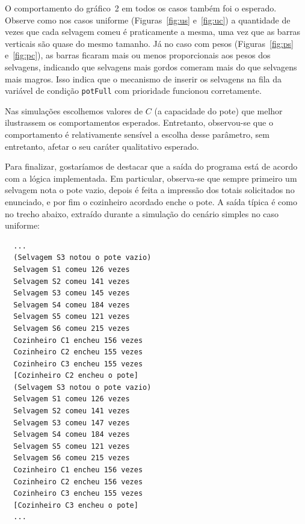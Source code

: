 \documentclass[11pt,a4paper]{article}
\begin{document}
O comportamento do gráfico~2 em todos os casos também foi o esperado. Observe como nos casos 
uniforme (Figuras~\ref{fig:us} e~\ref{fig:uc}) a quantidade de vezes que cada selvagem comeu é 
praticamente a mesma, uma vez que as barras verticais são quase do mesmo tamanho. Já no caso com 
pesos (Figuras~\ref{fig:ps} e~\ref{fig:pc}), as barras ficaram mais ou menos proporcionais aos pesos 
dos selvagens, indicando que selvagens mais gordos comeram mais do que selvagens mais magros. Isso 
indica que o mecanismo de inserir os selvagens na fila da variável de condição \verb|potFull| com 
prioridade funcionou corretamente.

Nas simulações escolhemos valores de $C$ (a capacidade do pote) que melhor ilustrassem os 
comportamentos esperados. Entretanto, observou-se que o comportamento é relativamente sensível a 
escolha desse parâmetro, sem entretanto, afetar o seu caráter qualitativo esperado.

Para finalizar, gostaríamos de destacar que a saída do programa está de acordo com a lógica 
implementada. Em particular, observa-se que sempre primeiro um selvagem nota o pote vazio, depois
é feita a impressão dos totais solicitados no enunciado, e por fim o cozinheiro acordado enche o 
pote. A saída típica é como no trecho abaixo, extraído durante a simulação do cenário simples no 
caso uniforme:

\begin{verbatim}
  ...
  (Selvagem S3 notou o pote vazio)
  Selvagem S1 comeu 126 vezes
  Selvagem S2 comeu 141 vezes
  Selvagem S3 comeu 145 vezes
  Selvagem S4 comeu 184 vezes
  Selvagem S5 comeu 121 vezes
  Selvagem S6 comeu 215 vezes
  Cozinheiro C1 encheu 156 vezes
  Cozinheiro C2 encheu 155 vezes
  Cozinheiro C3 encheu 155 vezes
  [Cozinheiro C2 encheu o pote]
  (Selvagem S3 notou o pote vazio)
  Selvagem S1 comeu 126 vezes
  Selvagem S2 comeu 141 vezes
  Selvagem S3 comeu 147 vezes
  Selvagem S4 comeu 184 vezes
  Selvagem S5 comeu 121 vezes
  Selvagem S6 comeu 215 vezes
  Cozinheiro C1 encheu 156 vezes
  Cozinheiro C2 encheu 156 vezes
  Cozinheiro C3 encheu 155 vezes
  [Cozinheiro C3 encheu o pote]
  ...
\end{verbatim}


\end{document}
